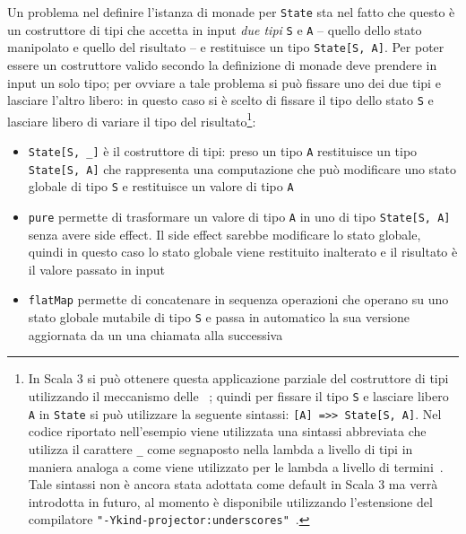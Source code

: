 Un problema nel definire l'istanza di monade per \lstinline{State} sta nel fatto che questo è un costruttore di tipi che accetta in input \emph{due tipi} \lstinline{S} e \lstinline{A} -- quello dello stato manipolato e quello del risultato -- e restituisce un tipo \lstinline{State[S, A]}. Per poter essere un costruttore valido secondo la definizione di monade deve prendere in input un solo tipo; per ovviare a tale problema si può fissare uno dei due tipi e lasciare l'altro libero: in questo caso si è scelto di fissare il tipo dello stato \lstinline{S} e lasciare libero di variare il tipo del risultato\footnote{In Scala 3 si può ottenere questa applicazione parziale del costruttore di tipi utilizzando il meccanismo delle ~\cite{cit:scala-reference-type-lambdas}; quindi per fissare il tipo \lstinline{S} e lasciare libero \lstinline{A} in \lstinline{State} si può utilizzare la seguente sintassi: \lstinline{[A] =>> State[S, A]}. Nel codice riportato nell'esempio viene utilizzata una sintassi abbreviata che utilizza il carattere \lstinline{_} come segnaposto nella lambda a livello di tipi in maniera analoga a come viene utilizzato per le lambda a livello di termini~\cite{cit:scala-reference-wildcard-arguments-in-types}. Tale sintassi non è ancora stata adottata come default in Scala 3 ma verrà introdotta in futuro, al momento è disponibile utilizzando l'estensione del compilatore \lstinline{"-Ykind-projector:underscores"}~\cite{cit:scala-reference-kind-projector-migration}.}:

\begin{itemize}
  \item \lstinline{State[S, _]} è il costruttore di tipi: preso un tipo \lstinline{A} restituisce un tipo \lstinline{State[S, A]} che rappresenta una computazione che può modificare uno stato globale di tipo \lstinline{S} e restituisce un valore di tipo \lstinline{A}
  \item \lstinline{pure} permette di trasformare un valore di tipo  \lstinline{A} in uno di tipo \lstinline{State[S, A]} senza avere side effect. Il side effect sarebbe modificare lo stato globale, quindi in questo caso lo stato globale viene restituito inalterato e il risultato è il valore passato in input
  \item \lstinline{flatMap} permette di concatenare in sequenza operazioni che operano su uno stato globale mutabile di tipo \lstinline{S} e passa in automatico la sua versione aggiornata da un una chiamata alla successiva
\end{itemize}

